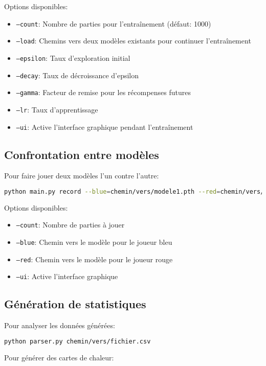 \documentclass[]{article}
\begin{document}
Options disponibles:
\begin{itemize}
  \item \texttt{--count}: Nombre de parties pour l'entraînement (défaut: 1000)
  \item \texttt{--load}: Chemins vers deux modèles existants pour continuer l'entraînement
  \item \texttt{--epsilon}: Taux d'exploration initial
  \item \texttt{--decay}: Taux de décroissance d'epsilon
  \item \texttt{--gamma}: Facteur de remise pour les récompenses futures
  \item \texttt{--lr}: Taux d'apprentissage
  \item \texttt{--ui}: Active l'interface graphique pendant l'entraînement
\end{itemize}

\subsection{Confrontation entre modèles}
Pour faire jouer deux modèles l'un contre l'autre:

\begin{lstlisting}[language=bash]
python main.py record --blue=chemin/vers/modele1.pth --red=chemin/vers/modele2.pth --count=100
\end{lstlisting}

Options disponibles:
\begin{itemize}
  \item \texttt{--count}: Nombre de parties à jouer
  \item \texttt{--blue}: Chemin vers le modèle pour le joueur bleu
  \item \texttt{--red}: Chemin vers le modèle pour le joueur rouge
  \item \texttt{--ui}: Active l'interface graphique
\end{itemize}

\subsection{Génération de statistiques}
Pour analyser les données générées:

\begin{lstlisting}[language=bash]
python parser.py chemin/vers/fichier.csv
\end{lstlisting}

Pour générer des cartes de chaleur:
\end{document}
